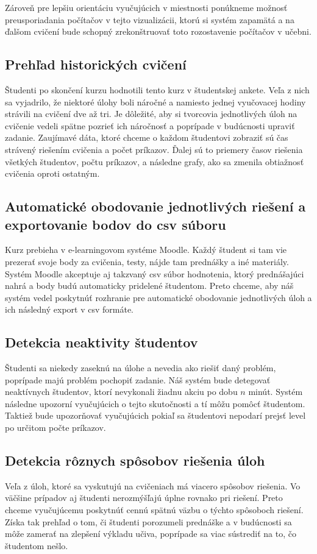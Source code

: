 Zároveň pre lepšiu orientáciu vyučujúcich v miestnosti ponúkneme možnosť
preusporiadania počítačov v tejto vizualizácii, ktorú si systém zapamätá a
na ďalšom cvičení bude schopný zrekonštruovať toto rozostavenie počítačov v učebni.

\subsection{Prehľad historických cvičení}
\label{sec:apprequirements:overview}

Študenti po skončení kurzu hodnotili tento kurz v študentskej ankete. Veľa z nich
sa vyjadrilo, že niektoré úlohy boli náročné a namiesto jednej vyučovacej hodiny
strávili na cvičení dve až tri.
Je dôležité, aby si tvorcovia jednotlivých úloh na cvičenie vedeli spätne pozrieť
ich náročnosť a poprípade v budúcnosti upraviť zadanie.
Zaujímavé dáta, ktoré chceme o každom študentovi zobraziť sú čas strávený riešením cvičenia a počet príkazov. Ďalej sú to priemery časov riešenia všetkých študentov,
počtu príkazov, a následne grafy, ako sa zmenila obtiažnosť cvičenia oproti ostatným.


\subsection{Automatické obodovanie jednotlivých riešení a exportovanie bodov do csv súboru}
\label{sec:apprequirements:export}

Kurz prebieha v e-learningovom systéme Moodle. Každý študent si tam vie prezerať
svoje body za cvičenia, testy, nájde tam prednášky a iné materiály. Systém Moodle akceptuje aj takzvaný
csv súbor hodnotenia, ktorý prednášajúci nahrá a body budú automaticky pridelené
študentom. Preto chceme, aby náš systém vedel poskytnúť rozhranie pre automatické
obodovanie jednotlivých úloh a ich následný export v csv formáte.

\subsection{Detekcia neaktivity študentov}
\label{sec:apprequirements:noactivity}

Študenti sa niekedy zaseknú na úlohe a nevedia ako riešiť daný problém, poprípade
majú problém pochopiť zadanie. Náš systém bude detegovať neaktívnych študentov, ktorí
nevykonali žiadnu akciu po dobu $n$ minút. Systém následne upozorní vyučujúcich o tejto
skutočnosti a tí môžu pomôcť študentom.
Taktiež bude upozorňovať vyučujúcich pokiaľ sa študentovi nepodarí prejsť level
po určitom počte príkazov.

\subsection{Detekcia rôznych spôsobov riešenia úloh}
\label{sec:apprequirements:similarsolutions}

Veľa z úloh, ktoré sa vyskutujú na cvičeniach má viacero spôsobov riešenia. Vo väčšine
prípadov aj študenti nerozmýšľajú úplne rovnako pri riešení. Preto chceme vyučujúcemu
poskytnúť cennú spätnú väzbu o týchto spôsoboch riešení. Získa tak prehľad
o tom, či študenti porozumeli prednáške a v budúcnosti sa môže zamerať na zlepšení
výkladu učiva, poprípade sa viac sústrediť na to, čo študentom nešlo.